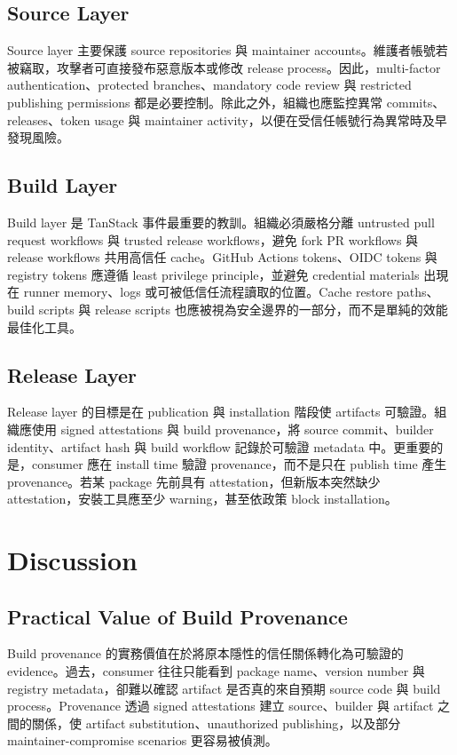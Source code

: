 \documentclass[12pt,a4paper]{article}
\begin{document}
\subsection{Source Layer}

Source layer 主要保護 source repositories 與 maintainer accounts。維護者帳號若被竊取，攻擊者可直接發布惡意版本或修改 release process。因此，multi-factor authentication、protected branches、mandatory code review 與 restricted publishing permissions 都是必要控制。除此之外，組織也應監控異常 commits、releases、token usage 與 maintainer activity，以便在受信任帳號行為異常時及早發現風險。

\subsection{Build Layer}

Build layer 是 TanStack 事件最重要的教訓。組織必須嚴格分離 untrusted pull request workflows 與 trusted release workflows，避免 fork PR workflows 與 release workflows 共用高信任 cache。GitHub Actions tokens、OIDC tokens 與 registry tokens 應遵循 least privilege principle，並避免 credential materials 出現在 runner memory、logs 或可被低信任流程讀取的位置。Cache restore paths、build scripts 與 release scripts 也應被視為安全邊界的一部分，而不是單純的效能最佳化工具。

\subsection{Release Layer}

Release layer 的目標是在 publication 與 installation 階段使 artifacts 可驗證。組織應使用 signed attestations 與 build provenance，將 source commit、builder identity、artifact hash 與 build workflow 記錄於可驗證 metadata 中。更重要的是，consumer 應在 install time 驗證 provenance，而不是只在 publish time 產生 provenance。若某 package 先前具有 attestation，但新版本突然缺少 attestation，安裝工具應至少 warning，甚至依政策 block installation。

\section{Discussion}

\subsection{Practical Value of Build Provenance}

Build provenance 的實務價值在於將原本隱性的信任關係轉化為可驗證的 evidence。過去，consumer 往往只能看到 package name、version number 與 registry metadata，卻難以確認 artifact 是否真的來自預期 source code 與 build process。Provenance 透過 signed attestations 建立 source、builder 與 artifact 之間的關係，使 artifact substitution、unauthorized publishing，以及部分 maintainer-compromise scenarios 更容易被偵測。
\end{document}
